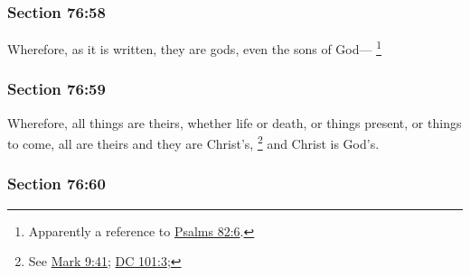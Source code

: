 
	\subsubsection{Section 76:58} %
		\label{DC76-58}

		Wherefore, as it is written, they are gods, even the sons of God---%
			\footnote{%
				Apparently a reference to \hyperref[PSALMS-82-6]{Psalms 82:6}.
				}


	\subsubsection{Section 76:59} %
		\label{DC76-59}

		Wherefore, all things are theirs, whether life or death, or things present, or things to come, all are theirs and they are Christ's,%
			\footnote{%
				See \hyperref[MARK-9-41]{Mark 9:41}; \hyperref[DC101-3]{DC 101:3}; 
				}
		and Christ is God's.


	\subsubsection{Section 76:60} %
		\label{DC76-60}

